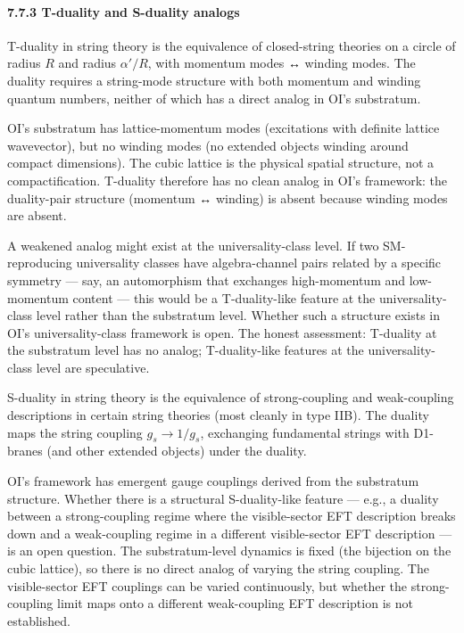 \documentclass[
]{article}
\begin{document}
\hypertarget{t-duality-and-s-duality-analogs}{%
\paragraph{7.7.3 T-duality and S-duality
analogs}\label{t-duality-and-s-duality-analogs}}

T-duality in string theory is the equivalence of closed-string theories
on a circle of radius \(R\) and radius \(\alpha'/R\), with momentum
modes ↔ winding modes. The duality requires a string-mode structure with
both momentum and winding quantum numbers, neither of which has a direct
analog in OI's substratum.

OI's substratum has lattice-momentum modes (excitations with definite
lattice wavevector), but no winding modes (no extended objects winding
around compact dimensions). The cubic lattice is the physical spatial
structure, not a compactification. T-duality therefore has no clean
analog in OI's framework: the duality-pair structure (momentum ↔
winding) is absent because winding modes are absent.

A weakened analog might exist at the universality-class level. If two
SM-reproducing universality classes have algebra-channel pairs related
by a specific symmetry --- say, an automorphism that exchanges
high-momentum and low-momentum content --- this would be a
T-duality-like feature at the universality-class level rather than the
substratum level. Whether such a structure exists in OI's
universality-class framework is open. The honest assessment: T-duality
at the substratum level has no analog; T-duality-like features at the
universality-class level are speculative.

S-duality in string theory is the equivalence of strong-coupling and
weak-coupling descriptions in certain string theories (most cleanly in
type IIB). The duality maps the string coupling \(g_s \to 1/g_s\),
exchanging fundamental strings with D1-branes (and other extended
objects) under the duality.

OI's framework has emergent gauge couplings derived from the substratum
structure. Whether there is a structural S-duality-like feature ---
e.g., a duality between a strong-coupling regime where the
visible-sector EFT description breaks down and a weak-coupling regime in
a different visible-sector EFT description --- is an open question. The
substratum-level dynamics is fixed (the bijection on the cubic lattice),
so there is no direct analog of varying the string coupling. The
visible-sector EFT couplings can be varied continuously, but whether the
strong-coupling limit maps onto a different weak-coupling EFT
description is not established.
\end{document}

